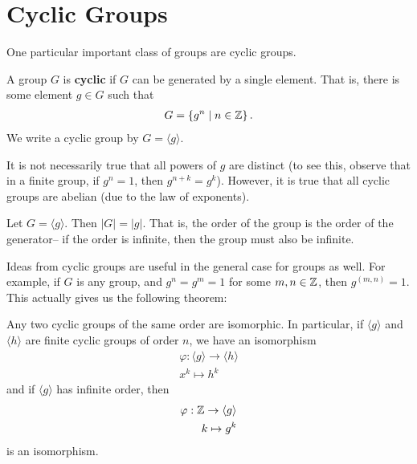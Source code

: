 \documentclass{memoir}
\begin{document}


\section{Cyclic Groups}
\label{sec:cyclic_groups}
One particular important class of groups are cyclic groups. 

\begin{defn}
	A group \(G\) is \textbf{cyclic} if \(G\) can be generated by a single element. That is, there is some element \(g \in G\) such that
	\begin{align*}
		G = \left\{ g^{n} \mid n \in \mathbb{Z} \right\} .
	\end{align*}
	We write a cyclic group by \(G = \langle g \rangle \).
\end{defn}
It is not necessarily true that all powers of \(g\) are distinct (to see this, observe that in a finite group, if \(g^{n}=1\), then \(g^{n+k}= g^{k}\)). However, it is true that all cyclic groups are abelian (due to the law of exponents).

\begin{prop}
	Let \(G = \langle g \rangle \). Then \(\left| G \right| = \left| g \right| \). That is, the order of the group is the order of the generator-- if the order is infinite, then the group must also be infinite.
\end{prop}
Ideas from cyclic groups are useful in the general case for groups as well. For example, if \(G\) is any group, and \(g^{n}=g^{m}=1\) for some \(m,n \in \mathbb{Z}\), then \(g^{(m,n)}=1\). This actually gives us the following theorem:

\begin{thm}
	Any two cyclic groups of the same order are isomorphic. In particular, if \(\langle g \rangle \) and \(\langle h \rangle \) are finite cyclic groups of order \(n\), we have an isomorphism
	\begin{align*}
		\varphi :\langle g \rangle \to \langle h \rangle \\
		x^{k}\mapsto h^{k}
	\end{align*}
	and if \(\langle g \rangle \) has infinite order, then
	\begin{align*}
		\varphi :\mathbb{Z}\to \langle g \rangle \\
		k \mapsto g^{k}
	\end{align*}
	is an isomorphism.
\end{thm}
\end{document}
